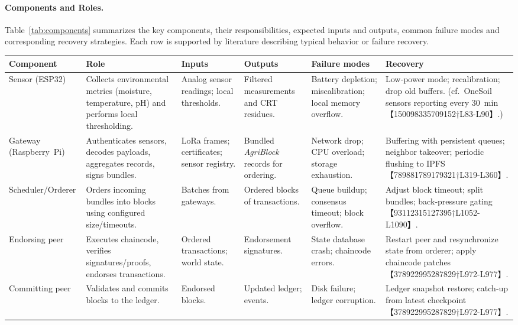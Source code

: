 \documentclass[12pt,onecolumn]{IEEEtran} %
\begin{document}
\paragraph{Components and Roles.}
Table~\ref{tab:components} summarizes the key components, their responsibilities, expected inputs and outputs, common failure modes and corresponding recovery strategies.  Each row is supported by literature describing typical behavior or failure recovery.

\begin{table*}[!t]
  \centering
  \caption{System components and their roles, inputs, outputs, and failure handling.}
  \label{tab:components}
  \begin{tabular}{p{2.5cm}p{3cm}p{2.7cm}p{2.7cm}p{3cm}p{3cm}}
    \toprule
    \textbf{Component} & \textbf{Role} & \textbf{Inputs} & \textbf{Outputs} & \textbf{Failure modes} & \textbf{Recovery} \\
    \midrule
    Sensor (ESP32) & Collects environmental metrics (moisture, temperature, pH) and performs local thresholding. & Analog sensor readings; local thresholds. & Filtered measurements and CRT residues. & Battery depletion; miscalibration; local memory overflow. & Low‑power mode; recalibration; drop old buffers.  (cf.~OneSoil sensors reporting every 30~min【150098335709152†L83-L90】.) \\
    Gateway (Raspberry~Pi) & Authenticates sensors, decodes payloads, aggregates records, signs bundles. & LoRa frames; certificates; sensor registry. & Bundled \emph{AgriBlock} records for ordering. & Network drop; CPU overload; storage exhaustion. & Buffering with persistent queues; neighbor takeover; periodic flushing to IPFS【789881789179321†L319-L360】. \\
    Scheduler/Orderer & Orders incoming bundles into blocks using configured size/timeouts. & Batches from gateways. & Ordered blocks of transactions. & Queue buildup; consensus timeout; block overflow. & Adjust block timeout; split bundles; back‑pressure gating【93112315127395†L1052-L1090】. \\
    Endorsing peer & Executes chaincode, verifies signatures/proofs, endorses transactions. & Ordered transactions; world state. & Endorsement signatures. & State database crash; chaincode errors. & Restart peer and resynchronize state from orderer; apply chaincode patches【378922995287829†L972-L977】. \\
    Committing peer & Validates and commits blocks to the ledger. & Endorsed blocks. & Updated ledger; events. & Disk failure; ledger corruption. & Ledger snapshot restore; catch‑up from latest checkpoint【378922995287829†L972-L977】. \\

\end{tabular}
\end{table*}
\end{document}

